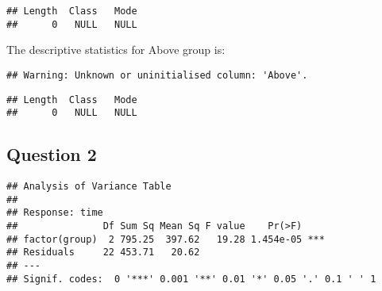\documentclass[]{article}
\newenvironment{Shaded}{\begin{snugshade}}{\end{snugshade}}
\newcommand{\KeywordTok}[1]{\textcolor[rgb]{0.13,0.29,0.53}{\textbf{#1}}}
\newcommand{\DataTypeTok}[1]{\textcolor[rgb]{0.13,0.29,0.53}{#1}}
\newcommand{\StringTok}[1]{\textcolor[rgb]{0.31,0.60,0.02}{#1}}
\newcommand{\CommentTok}[1]{\textcolor[rgb]{0.56,0.35,0.01}{\textit{#1}}}
\newcommand{\OperatorTok}[1]{\textcolor[rgb]{0.81,0.36,0.00}{\textbf{#1}}}
\newcommand{\NormalTok}[1]{#1}
\begin{document}
\begin{verbatim}
## Length  Class   Mode 
##      0   NULL   NULL
\end{verbatim}

The descriptive statistics for Above group is:

\begin{Shaded}
\end{Shaded}

\begin{verbatim}
## Warning: Unknown or uninitialised column: 'Above'.
\end{verbatim}

\begin{verbatim}
## Length  Class   Mode 
##      0   NULL   NULL
\end{verbatim}

\subsection{Question 2}\label{question-2-2}

\begin{Shaded}
\end{Shaded}

\begin{verbatim}
## Analysis of Variance Table
## 
## Response: time
##               Df Sum Sq Mean Sq F value    Pr(>F)    
## factor(group)  2 795.25  397.62   19.28 1.454e-05 ***
## Residuals     22 453.71   20.62                      
## ---
## Signif. codes:  0 '***' 0.001 '**' 0.01 '*' 0.05 '.' 0.1 ' ' 1
\end{verbatim}
\end{document}

